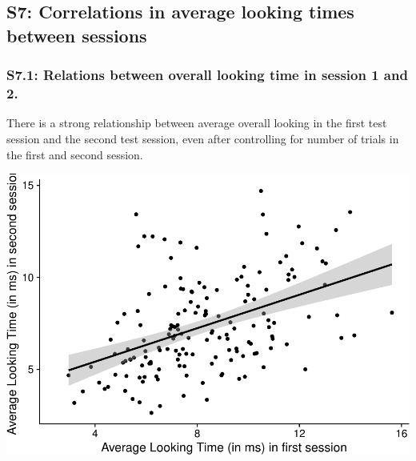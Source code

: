 \documentclass[
  man, donotrepeattitle,floatsintext]{apa6}
\begin{document}
\hypertarget{s7-correlations-in-average-looking-times-between-sessions}{%
\subsection{S7: Correlations in average looking times between sessions}\label{s7-correlations-in-average-looking-times-between-sessions}}

\hypertarget{s7.1-relations-between-overall-looking-time-in-session-1-and-2.}{%
\subsubsection{S7.1: Relations between overall looking time in session 1 and 2.}\label{s7.1-relations-between-overall-looking-time-in-session-1-and-2.}}

There is a strong relationship between average overall looking in the first test session and the second test session, even after controlling for number of trials in the first and second session.

\includegraphics{MB1T_supplement_files/figure-latex/unnamed-chunk-8-1.pdf}
\end{document}
